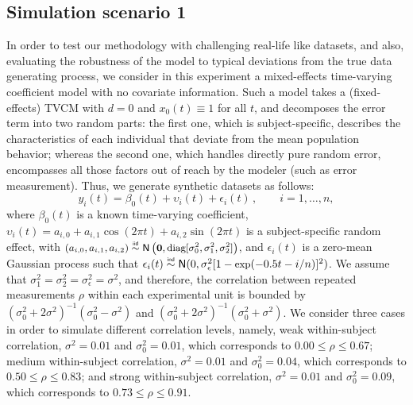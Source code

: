 \documentclass[letterpaper,10pt,openany]{article}
\newcommand\simiid{\mathrel{\overset{\makebox[0pt]{\mbox{\normalfont\tiny\sffamily iid}}}{\sim}}}
\newcommand\simind{\mathrel{\overset{\makebox[0pt]{\mbox{\normalfont\tiny\sffamily ind}}}{\sim}}}
\def\Nor{\small{\mathsf{N}}}
\def\zerov{\boldsymbol{0}}
\begin{document}
\subsection{Simulation scenario 1} \label{sec_simulation_1}


{\color{black} In order to test our methodology with challenging real-life like datasets, and also, evaluating the robustness of the model to typical deviations from the true data generating process, we consider in this experiment a mixed-effects time-varying coefficient model with no covariate information. Such a model takes a (fixed-effects) \textsf{TVCM} with $d=0$ and $x_0(t)\equiv 1$ for all $t$, and decomposes the error term into two random parts: the first one, which is subject-specific, describes the characteristics of each individual that deviate from the mean population behavior; whereas the second one, which handles directly pure random error, encompasses all those factors out of reach by the modeler (such as error measurement). Thus,} we generate synthetic datasets as follows:
\begin{equation}\label{eq_tvcm_sim1}
y_i(t) = \beta_0(t) + \upsilon_{i}(t) + \epsilon_i(t)\,,\qquad i = 1,\ldots,n,
\end{equation}
where $\beta_0(t)$ is a known time-varying coefficient, $\upsilon_{i}(t) =a_{i,0} + a_{i,1}\cos(2 \pi t) + a_{i,2}\sin(2 \pi t)$ is a subject-specific random effect, with $(a_{i,0},a_{i,1},a_{i,2})\simiid \Nor\left(\zerov,\text{diag}[\sigma_0^2,\sigma_1^2,\sigma_2^2]\right)$, and $\epsilon_i(t)$ is a zero-mean Gaussian process such that $\epsilon_i(t)\simind\Nor(0,\sigma_\epsilon^2 [1-\text{exp}(-0.5t - i/n)]^2)$. We assume that $\sigma_1^2=\sigma_2^2=\sigma_\epsilon^2=\sigma^2$, and therefore, the correlation between repeated measurements $\rho$ within each experimental unit is bounded by $(\sigma_0^2+2\sigma^2)^{-1}(\sigma_0^2-\sigma^2)$ and $(\sigma_0^2+2\sigma^2)^{-1}(\sigma_0^2+\sigma^2)$. We consider three cases in order to simulate different correlation levels, namely, weak within-subject correlation, $\sigma^2=0.01$ and $\sigma_0^2=0.01$, which corresponds to $0.00 \leq\rho\leq 0.67$; medium within-subject correlation, $\sigma^2=0.01$ and $\sigma_0^2=0.04$, which corresponds to $0.50\leq\rho\leq 0.83$; and strong within-subject correlation, $\sigma^2=0.01$ and $\sigma_0^2=0.09$, which corresponds to $0.73\leq\rho\leq 0.91$.
\end{document}
